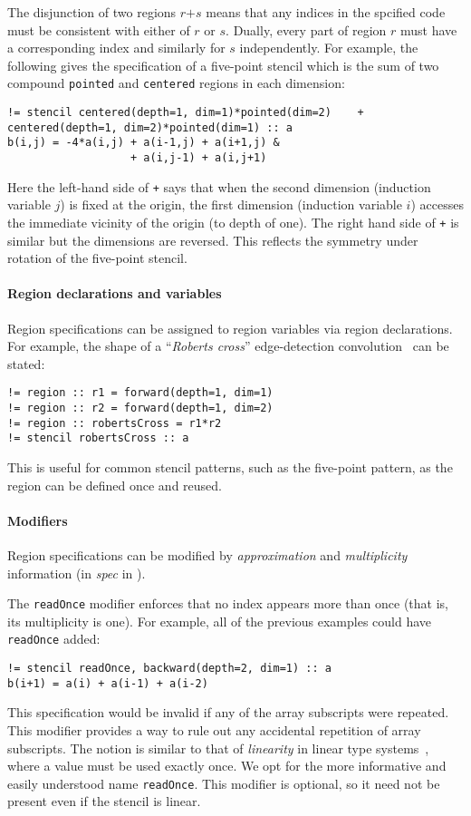 \documentclass[10pt,preprint,numbers]{sigplanconf}
\theoremstyle{definition}
\newcommand{\term}[1]{\texttt{#1}}
\begin{document}
The disjunction of two regions $r \term{+} s$ means that any indices
in the spcified code must be consistent with either of $r$ or $s$.
Dually, every part of region $r$ must have a
corresponding index and similarly for $s$ independently. For
example, the following gives the specification of a five-point
stencil which is the sum of two compound \texttt{pointed} and
\texttt{centered} regions in each dimension:
%
\begin{verbatim}
!= stencil centered(depth=1, dim=1)*pointed(dim=2)    + centered(depth=1, dim=2)*pointed(dim=1) :: a
b(i,j) = -4*a(i,j) + a(i-1,j) + a(i+1,j) &
                   + a(i,j-1) + a(i,j+1)
\end{verbatim}
Here the left-hand side of \texttt{+} says that when the second dimension
(induction variable $j$) is fixed at the origin, the first dimension
(induction variable $i$) accesses the immediate vicinity of the origin
(to depth of one). The right hand side of \texttt{+} is similar but the dimensions are reversed.
This reflects the symmetry under rotation of the five-point stencil.

\paragraph{Region declarations and variables}

Region specifications can be assigned to region variables via
region declarations. For example, the shape of a
``\emph{Roberts cross}'' edge-detection convolution~\cite{davis1975survey}
can be stated:
\begin{verbatim}
!= region :: r1 = forward(depth=1, dim=1)
!= region :: r2 = forward(depth=1, dim=2)
!= region :: robertsCross = r1*r2
!= stencil robertsCross :: a
\end{verbatim}
This is useful for common stencil patterns, such as the five-point
pattern, as the region can be defined once and reused.
\paragraph{Modifiers}
Region specifications can be modified
by \emph{approximation} and \emph{multiplicity} information
(in \textit{spec} in ).

The \texttt{readOnce} modifier enforces that no index appears more
than once (that is, its multiplicity is one). For example, all of
the previous examples could have \texttt{readOnce} added:
%
\begin{verbatim}
!= stencil readOnce, backward(depth=2, dim=1) :: a
b(i+1) = a(i) + a(i-1) + a(i-2)
\end{verbatim}
%
This specification would be invalid if any of the
array subscripts were repeated. This modifier provides a way to
rule out any accidental repetition of array subscripts.
The notion is similar to that of \emph{linearity} in linear type
systems~\cite{wadler1990linear}, where a value must be used
exactly once. We opt for the more informative and easily understood name
\texttt{readOnce}. This modifier is optional, so it need not
be present even if the stencil is linear.
\end{document}
